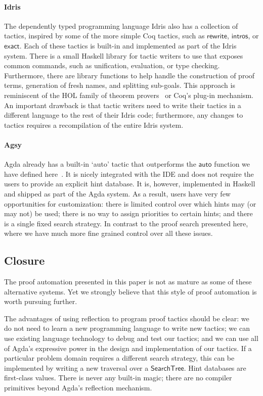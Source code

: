 \documentclass[preprint]{sigplanconf}
\newcommand{\Conid}[1]{\mathit{#1}}
\newcommand{\Varid}[1]{\mathit{#1}}
\renewcommand\Varid[1]{\mathord{\textsf{#1}}}
\let\Conid\Varid
\begin{document}
\paragraph{Idris}
The dependently typed programming language Idris also has a collection
of tactics, inspired by some of the more simple Coq tactics, such as
\ensuremath{\Varid{rewrite}}, \ensuremath{\Varid{intros}}, or \ensuremath{\Varid{exact}}. Each of these tactics is built-in and
implemented as part of the Idris system. There is a small Haskell
library for tactic writers to use that exposes common commands, such
as unification, evaluation, or type checking. Furthermore, there are
library functions to help handle the construction of proof terms,
generation of fresh names, and splitting sub-goals. This approach is
reminiscent of the HOL family of theorem provers~\cite{hol} or Coq's
plug-in mechanism. An important drawback is that tactic writers need
to write their tactics in a different language to the rest of their
Idris code; furthermore, any changes to tactics requires a
recompilation of the entire Idris system.

\paragraph{Agsy}

Agda already has a built-in `auto' tactic that outperforms the \ensuremath{\Varid{auto}}
function we have defined here~\cite{lindblad}. It is nicely integrated
with the IDE and does not require the users to provide an explicit
hint database. It is, however, implemented in Haskell and shipped as
part of the Agda system. As a result, users have very few
opportunities for customization: there is limited control over which
hints may (or may not) be used; there is no way to assign priorities
to certain hints; and there is a single fixed search strategy. In
contrast to the proof search presented here, where we have much more
fine grained control over all these issues.

\subsection*{Closure}

The proof automation presented in this paper is not as mature as some
of these alternative systems. Yet we strongly believe that this style
of proof automation is worth pursuing further.

The advantages of using reflection to program proof tactics should be
clear: we do not need to learn a new programming language to write new
tactics; we can use existing language technology to debug and test our
tactics; and we can use all of Agda's expressive power in the design
and implementation of our tactics. If a particular problem domain
requires a different search strategy, this can be implemented by
writing a new traversal over a \ensuremath{\Conid{SearchTree}}. Hint databases are
first-class values. There is never any built-in magic; there are no
compiler primitives beyond Agda's reflection mechanism.
\end{document}
